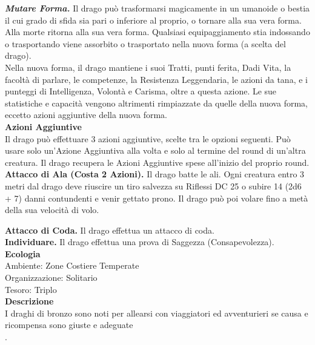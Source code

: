 \begin{multicols}{2}
\emph{\textbf{Mutare Forma.}} Il drago può trasformarsi magicamente in un umanoide o bestia il cui grado di sfida sia pari o inferiore al proprio, o tornare alla sua vera forma. Alla morte ritorna alla sua vera forma. Qualsiasi equipaggiamento stia indossando o trasportando viene assorbito o trasportato nella nuova forma (a scelta del drago). \\
Nella nuova forma, il drago mantiene i suoi Tratti, punti ferita, Dadi Vita, la facoltà di parlare, le competenze, la Resistenza Leggendaria, le azioni da tana, e i punteggi di Intelligenza, Volontà e Carisma, oltre a questa azione. Le sue statistiche e capacità vengono altrimenti rimpiazzate da quelle della nuova forma, eccetto azioni aggiuntive della nuova forma.\\
\textbf{Azioni Aggiuntive}\\
Il drago può effettuare 3 azioni aggiuntive, scelte tra le opzioni seguenti. Può usare solo un'Azione Aggiuntiva alla volta e solo al termine del round di un'altra creatura. Il drago recupera le Azioni Aggiuntive spese all'inizio del proprio round.\\

\textbf{Attacco di Ala (Costa 2 Azioni).} Il drago batte le ali. Ogni creatura entro 3 metri dal drago deve riuscire un tiro salvezza su Riflessi DC  25 o subire 14 (2d6 + 7) danni contundenti e venir gettato prono. Il drago può poi volare fino a metà della sua velocità di volo.

\textbf{Attacco di Coda.} Il drago effettua un attacco di coda.\\
\textbf{Individuare.} Il drago effettua una prova di Saggezza (Consapevolezza).\\
\textbf{Ecologia}\\
Ambiente: Zone Costiere Temperate\\
Organizzazione: Solitario\\
Tesoro: Triplo\\
\textbf{Descrizione}\\
I draghi di bronzo sono noti per allearsi con viaggiatori ed avventurieri se causa e ricompensa sono giuste e adeguate\\
.


\end{multicols}
